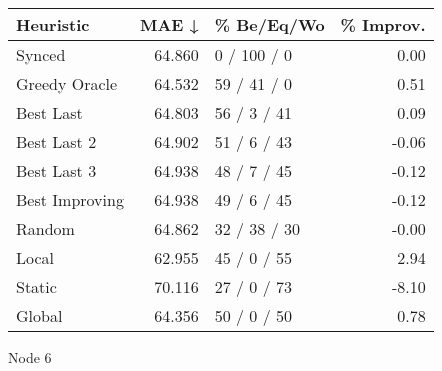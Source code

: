 \begin{tabular}{lrlr}
\toprule
\textbf{Heuristic} & \textbf{MAE ↓} & \textbf{\% Be/Eq/Wo} & \textbf{\% Improv.} \\
\midrule
            Synced &         64.860 &          0 / 100 / 0 &                0.00 \\
     Greedy Oracle &         64.532 &          59 / 41 / 0 &                0.51 \\
         Best Last &         64.803 &          56 / 3 / 41 &                0.09 \\
       Best Last 2 &         64.902 &          51 / 6 / 43 &               -0.06 \\
       Best Last 3 &         64.938 &          48 / 7 / 45 &               -0.12 \\
    Best Improving &         64.938 &          49 / 6 / 45 &               -0.12 \\
            Random &         64.862 &         32 / 38 / 30 &               -0.00 \\
             Local &         62.955 &          45 / 0 / 55 &                2.94 \\
            Static &         70.116 &          27 / 0 / 73 &               -8.10 \\
            Global &         64.356 &          50 / 0 / 50 &                0.78 \\
\bottomrule
\end{tabular}
\caption{Node 6}
\label{tab:iid_lr01_le2_bs4_6}
